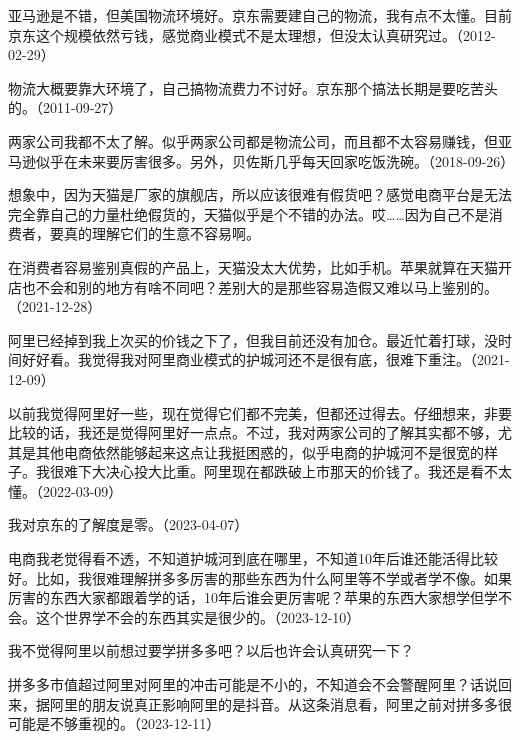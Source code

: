 
亚马逊是不错，但美国物流环境好。京东需要建自己的物流，我有点不太懂。目前京东这个规模依然亏钱，感觉商业模式不是太理想，但没太认真研究过。（2012-02-29）

物流大概要靠大环境了，自己搞物流费力不讨好。京东那个搞法长期是要吃苦头的。（2011-09-27）


两家公司我都不太了解。似乎两家公司都是物流公司，而且都不太容易赚钱，但亚马逊似乎在未来要厉害很多。另外，贝佐斯几乎每天回家吃饭洗碗。（2018-09-26）

想象中，因为天猫是厂家的旗舰店，所以应该很难有假货吧？感觉电商平台是无法完全靠自己的力量杜绝假货的，天猫似乎是个不错的办法。哎……因为自己不是消费者，要真的理解它们的生意不容易啊。


在消费者容易鉴别真假的产品上，天猫没太大优势，比如手机。苹果就算在天猫开店也不会和别的地方有啥不同吧？差别大的是那些容易造假又难以马上鉴别的。（2021-12-28）

阿里已经掉到我上次买的价钱之下了，但我目前还没有加仓。最近忙着打球，没时间好好看。我觉得我对阿里商业模式的护城河还不是很有底，很难下重注。（2021-12-09）


以前我觉得阿里好一些，现在觉得它们都不完美，但都还过得去。仔细想来，非要比较的话，我还是觉得阿里好一点点。不过，我对两家公司的了解其实都不够，尤其是其他电商依然能够起来这点让我挺困惑的，似乎电商的护城河不是很宽的样子。我很难下大决心投大比重。阿里现在都跌破上市那天的价钱了。我还是看不太懂。（2022-03-09）

我对京东的了解度是零。（2023-04-07）

电商我老觉得看不透，不知道护城河到底在哪里，不知道10年后谁还能活得比较好。比如，我很难理解拼多多厉害的那些东西为什么阿里等不学或者学不像。如果厉害的东西大家都跟着学的话，10年后谁会更厉害呢？苹果的东西大家想学但学不会。这个世界学不会的东西其实是很少的。（2023-12-10）


我不觉得阿里以前想过要学拼多多吧？以后也许会认真研究一下？

拼多多市值超过阿里对阿里的冲击可能是不小的，不知道会不会警醒阿里？话说回来，据阿里的朋友说真正影响阿里的是抖音。从这条消息看，阿里之前对拼多多很可能是不够重视的。（2023-12-11）

